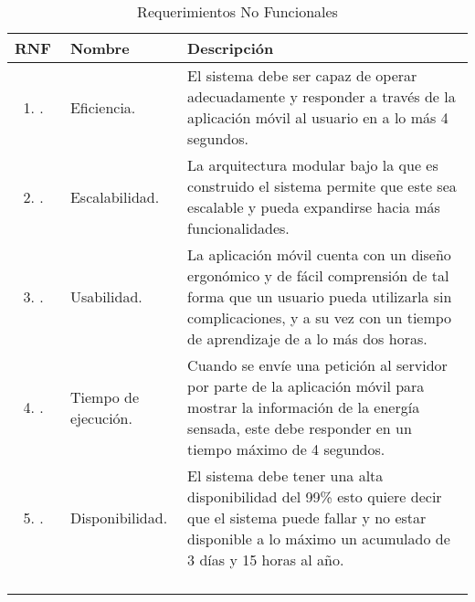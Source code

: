 \begin{longtable}{|M{1.6cm}|M{4.0cm}|M{6.0cm}|}
    \caption{Requerimientos No Funcionales}
	\hline
	\textbf{RNF} & \textbf{Nombre} & \textbf{Descripción} \\
	\hline
 	\begin{enumerate}[label=RNF\arabic*]
 	    \item.
 	\end{enumerate}
 	& Eficiencia.
 	& El sistema debe ser capaz de operar adecuadamente y responder a través de la aplicación móvil al usuario en a lo más 4 segundos.\\
    \hline
    \begin{enumerate}[label=RNF\arabic*]
        \setcounter{enumi}{1}
 	    \item.
 	\end{enumerate}
 	& Escalabilidad.
 	& La arquitectura modular bajo la que es construido el sistema permite que este sea escalable y pueda expandirse hacia más funcionalidades.\\
    \hline
    \begin{enumerate}[label=RNF\arabic*]
        \setcounter{enumi}{2}
 	    \item.
 	\end{enumerate}
 	& Usabilidad. 
 	& La aplicación móvil cuenta con un diseño ergonómico y de fácil comprensión de tal forma que un usuario pueda utilizarla sin complicaciones, y a su vez con un tiempo de aprendizaje de a lo más dos horas.\\
    \hline
    \begin{enumerate}[label=RNF\arabic*]
        \setcounter{enumi}{3}
 	    \item.
 	\end{enumerate}
 	& Tiempo de ejecución.
 	& Cuando se envíe una petición al servidor por parte de la aplicación móvil para mostrar la información de la energía sensada, este debe responder en un tiempo máximo de 4 segundos.  \\
    \hline
    \begin{enumerate}[label=RNF\arabic*]
        \setcounter{enumi}{4}
 	    \item.
 	\end{enumerate}
 	& Disponibilidad.
 	& El sistema debe tener una alta disponibilidad del 99\% esto quiere decir que el sistema puede fallar y no estar disponible a lo máximo un acumulado de 3 días y 15 horas al año.  \\
    \hline
    \begin{enumerate}[label=RNF\arabic*]

\end{enumerate}
\end{longtable}
